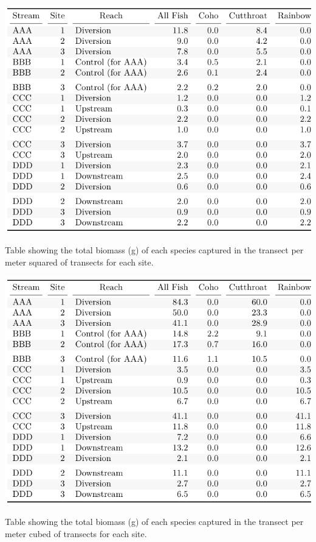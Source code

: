 \begin{table}[H]
\includegraphics{Chapter5Images/kable_gm2.pdf}
\caption{   \hspace{1mm}Table showing the total biomass (g) of each species captured in the transect per meter squared of transects for each site.}
\label{fig:kablemass2}
\end{table}



\begin{table}[H]
\includegraphics{Chapter5Images/kable_gm3.pdf}
\caption{  \hspace{1mm} Table showing the total biomass (g) of each species captured in the transect per meter cubed of transects for each site.}
\label{fig:kablemass3}
\end{table}





